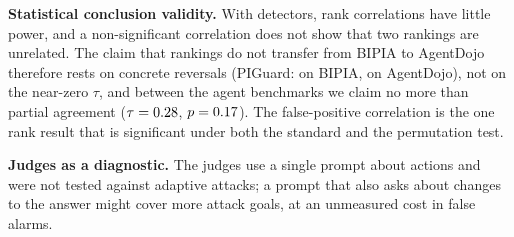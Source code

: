 \noindent\textbf{Statistical conclusion validity.} With \NDetectors detectors, rank correlations have little power, and a non-significant correlation does not show that two rankings are unrelated. The claim that rankings do not transfer from BIPIA to AgentDojo therefore rests on concrete reversals (PIGuard: \BIPGTpr on BIPIA, \ADPGTpr on AgentDojo), not on the near-zero $\tau$, and between the agent benchmarks we claim no more than partial agreement ($\tau=0.28$, $p=0.17$). The false-positive correlation is the one rank result that is significant under both the standard and the permutation test.

\noindent\textbf{Judges as a diagnostic.} The judges use a single prompt about actions and were not tested against adaptive attacks; a prompt that also asks about changes to the answer might cover more attack goals, at an unmeasured cost in false alarms.
